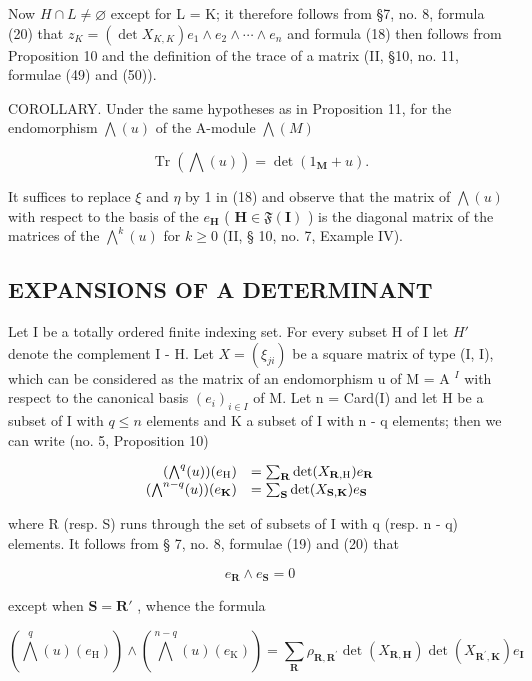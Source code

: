 Now \(H \cap L \neq \varnothing\) except for L = K; it therefore follows from §7, no. 8, formula (20) that \(z_{K} = (\det X_{K,K})e_{1} \wedge e_{2} \wedge \cdots \wedge e_{n}\) and formula (18) then follows from Proposition 10 and the definition of the trace of a matrix (II, §10, no. 11, formulae (49) and (50)).

COROLLARY. Under the same hypotheses as in Proposition 11, for the endomorphism \(\bigwedge(u)\) of the A-module \(\bigwedge(M)\)

\[
\operatorname{Tr} (\bigwedge (u)) = \det (1 _ {\mathbf {M}} + u).\tag{19}
\]

It suffices to replace \(\xi\) and \(\eta\) by 1 in (18) and observe that the matrix of \(\bigwedge(u)\) with respect to the basis of the \(e_{\mathbf{H}}\) ( \(\mathbf{H} \in \mathfrak{F}(\mathbf{I})\) ) is the diagonal matrix of the matrices of the \(\bigwedge^{k}(u)\) for \(k \geqslant 0\) (II, § 10, no. 7, Example IV).

\subsection{EXPANSIONS OF A DETERMINANT}

Let I be a totally ordered finite indexing set. For every subset H of I let \(H'\) denote the complement I - H. Let \(X = (\xi_{ji})\) be a square matrix of type (I, I), which can be considered as the matrix of an endomorphism u of M = A \(^{I}\) with respect to the canonical basis \((e_{i})_{i \in I}\) of M. Let n = Card(I) and let H be a subset of I with \(q \leqslant n\) elements and K a subset of I with n - q elements; then we can write (no. 5, Proposition 10)

\[
\begin{array}{r l} (\bigwedge^ {q} (u)) (e _ {\mathrm{H}}) & = \sum_ {\mathbf {R}} \det (X _ {\mathbf {R}, \mathrm{H}}) e _ {\mathbf {R}} \\ (\bigwedge^ {n - q} (u)) (e _ {\mathbf {K}}) & = \sum_ {\mathbf {S}} \det (X _ {\mathbf {S}, \mathbf {K}}) e _ {\mathbf {S}} \end{array}
\]

where R (resp. S) runs through the set of subsets of I with q (resp. n - q) elements. It follows from § 7, no. 8, formulae (19) and (20) that

\[
e _ {\mathbf {R}} \wedge e _ {\mathbf {S}} = 0
\]

except when \(\mathbf{S} = \mathbf{R}'\) , whence the formula

\[
\left(\bigwedge^ {q} (u) \left(e _ {\mathrm{H}}\right)\right) \wedge \left(\bigwedge^ {n - q} (u) \left(e _ {\mathrm{K}}\right)\right) = \sum_ {\mathbf {R}} \rho_ {\mathbf {R}, \mathbf {R} ^ {\prime}} \det \left(X _ {\mathbf {R}, \mathbf {H}}\right) \det \left(X _ {\mathbf {R} ^ {\prime}, \mathbf {K}}\right) e _ {\mathbf {I}}\tag{20}
\]

